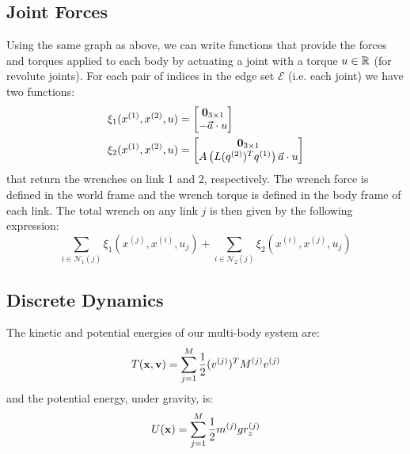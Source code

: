 \documentclass[../root.tex]{subfiles}
\begin{document}
\subsection{Joint Forces}
Using the same graph as above, we can write functions that provide the forces and torques 
applied to each body by actuating a joint with a torque $u \in \mathbb{R}$ (for revolute joints). 
For each pair of indices in the edge set $\mathcal{E}$ (i.e. each joint) we have two 
functions: 
\begin{subequations}
    \begin{align}
    \xi_1(x^{(1)}, x^{(2)}, u) &= \begin{bmatrix}
        \mathbf{0}_{3 \times 1} \\ -\vec{a} \cdot u
    \end{bmatrix} \\
    \xi_2(x^{(1)}, x^{(2)}, u) &= \begin{bmatrix}
        \mathbf{0}_{3 \times 1} \\
        A\left(L(q^{(2)})^T q^{(1)}\right) \vec{a} \cdot u
    \end{bmatrix}
    \end{align} 
\end{subequations}
that return the wrenches on link 1 and 2, respectively. The wrench force is defined in the 
world frame and the wrench torque is defined in the body frame of each link.
The total wrench on any link $j$ is then given by the following expression:
\begin{equation} \label{eq:link_wrench}
    \sum_{i \in \mathcal{N}_1(j)} \xi_1\left(x^{(j)}, x^{(i)}, u_j\right) + 
    \sum_{i \in \mathcal{N}_2(j)} \xi_2\left(x^{(i)}, x^{(j)}, u_j\right)
\end{equation}

\subsection{Discrete Dynamics} \label{sec:discrete_dynamics}
The kinetic and potential energies of our multi-body system are:
\begin{equation}
    T(\mathbf{x},\mathbf{v}) = \sum_{j=1}^M \frac{1}{2} (v^{(j)})^T M^{(j)} v^{(j)}
\end{equation}
and the potential energy, under gravity, is:
\begin{equation}
    U(\mathbf{x}) = \sum_{j=1}^M \frac{1}{2} m^{(j)} g r_z^{(j)}
\end{equation}
\end{document}
